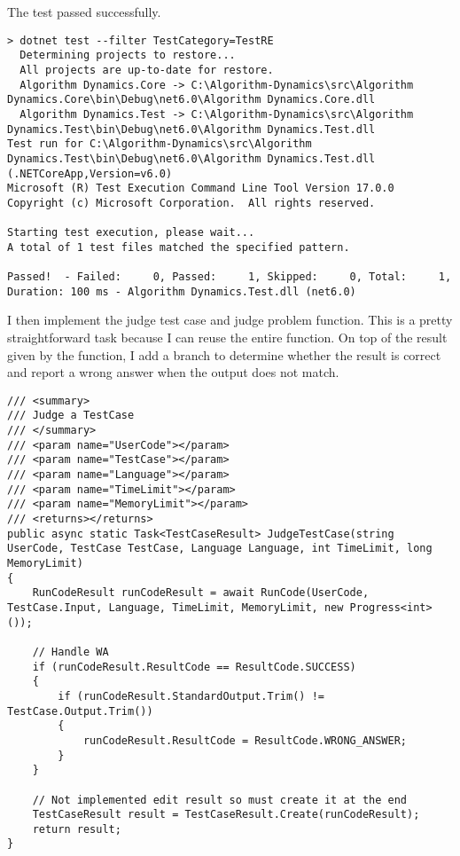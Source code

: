 \documentclass[report.tex]{subfiles}
\begin{document}
The test passed successfully.

\begin{verbatim}
> dotnet test --filter TestCategory=TestRE
  Determining projects to restore...
  All projects are up-to-date for restore.
  Algorithm Dynamics.Core -> C:\Algorithm-Dynamics\src\Algorithm Dynamics.Core\bin\Debug\net6.0\Algorithm Dynamics.Core.dll
  Algorithm Dynamics.Test -> C:\Algorithm-Dynamics\src\Algorithm Dynamics.Test\bin\Debug\net6.0\Algorithm Dynamics.Test.dll
Test run for C:\Algorithm-Dynamics\src\Algorithm Dynamics.Test\bin\Debug\net6.0\Algorithm Dynamics.Test.dll (.NETCoreApp,Version=v6.0)
Microsoft (R) Test Execution Command Line Tool Version 17.0.0
Copyright (c) Microsoft Corporation.  All rights reserved.

Starting test execution, please wait...
A total of 1 test files matched the specified pattern.

Passed!  - Failed:     0, Passed:     1, Skipped:     0, Total:     1, Duration: 100 ms - Algorithm Dynamics.Test.dll (net6.0)
\end{verbatim}

I then implement the judge test case and judge problem function. This is a pretty straightforward task because I can reuse the entire  function. On top of the result given by the  function, I add a branch to determine whether the result is correct and report a wrong answer when the output does not match.

\begin{verbatim}
/// <summary>
/// Judge a TestCase
/// </summary>
/// <param name="UserCode"></param>
/// <param name="TestCase"></param>
/// <param name="Language"></param>
/// <param name="TimeLimit"></param>
/// <param name="MemoryLimit"></param>
/// <returns></returns>
public async static Task<TestCaseResult> JudgeTestCase(string UserCode, TestCase TestCase, Language Language, int TimeLimit, long MemoryLimit)
{
    RunCodeResult runCodeResult = await RunCode(UserCode, TestCase.Input, Language, TimeLimit, MemoryLimit, new Progress<int>());
    
    // Handle WA
    if (runCodeResult.ResultCode == ResultCode.SUCCESS)
    {
        if (runCodeResult.StandardOutput.Trim() != TestCase.Output.Trim())
        {
            runCodeResult.ResultCode = ResultCode.WRONG_ANSWER;
        }
    }

    // Not implemented edit result so must create it at the end
    TestCaseResult result = TestCaseResult.Create(runCodeResult);
    return result;
}
\end{verbatim}
\end{document}
